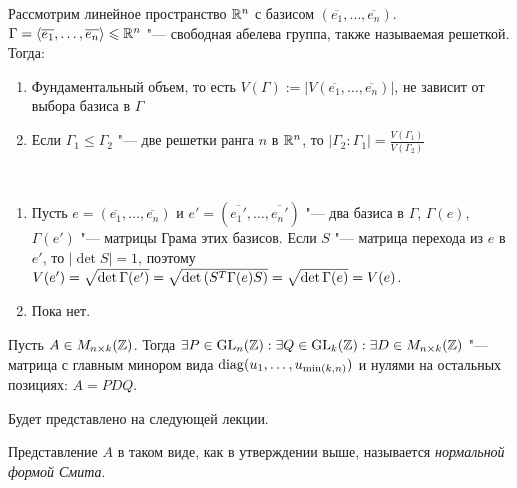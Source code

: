 \begin{exercise}
	Рассмотрим линейное пространство $\mathbb{R}^n$ с базисом $(\overline{e_1}, \dotsc, \overline{e_n})$. $\Gamma \hm= \gl \overline{e_1}, \dotsc, \overline{e_n}\gr \le \R^n$ "--- свободная абелева группа, также называемая решеткой. Тогда:
	\begin{enumerate}
		\item Фундаментальный объем, то есть $V(\Gamma) := |V(\overline{e_1}, \dotsc, \overline{e_n})|$, не зависит от выбора базиса в $\Gamma$
		
		\item Если $\Gamma_1 \le \Gamma_2$ "--- две решетки ранга $n$ в $\mathbb{R}^n$, то $|\Gamma_2 : \Gamma_1| = \frac{V(\Gamma_1)}{V(\Gamma_2)}$
	\end{enumerate}
\end{exercise}

\begin{solution}~
	\begin{enumerate}
		\item Пусть $e = (\overline{e_1}, \dotsc, \overline{e_n})$ и $e' = (\overline{e_1'}, \dotsc, \overline{e_n'})$ "--- два базиса в $\Gamma$, $\Gamma(e)$, $\Gamma(e')$ "--- матрицы Грама этих базисов. Если $S$ "--- матрица перехода из $e$ в $e'$, то $|\det{S}| = 1$, поэтому $V(e') \hm= \sqrt{\det\Gamma(e')} \hm= \sqrt{\det{(S^T\Gamma(e)S)}} = \sqrt{\det\Gamma(e)} = V(e)$.
		
		\item Пока нет.
	\end{enumerate}
\end{solution}

\begin{proposition}
	Пусть $A \in M_{n \times k}(\mathbb{Z})$. Тогда $\exists P \hm\in \GL_n(\Z): \exists Q \in \GL_k(\Z): \exists D \hm\in M_{n \times k}(\Z)$ "--- матрица с главным минором вида $\operatorname{diag}(u_1, \dotsc, u_{\min(k, n)})$ и нулями на остальных позициях: $A = PDQ$.
\end{proposition}

\begin{solution}
	Будет представлено на следующей лекции.
\end{solution}

\begin{note}
	Представление $A$ в таком виде, как в утверждении выше, называется \textit{нормальной формой Смита}.
\end{note}

